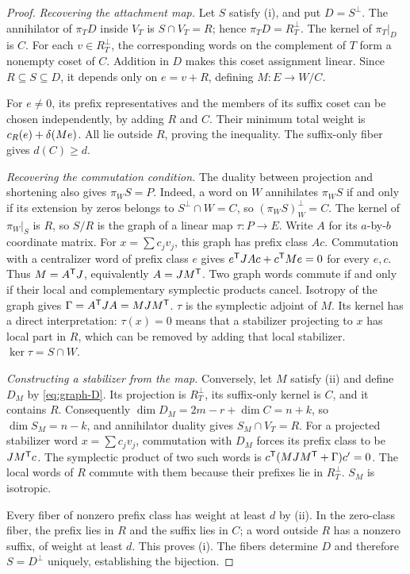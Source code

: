 \begin{proof}
\emph{Recovering the attachment map.}
Let \(S\) satisfy (i), and put \(D=S^\perp\). The annihilator of
\(\pi_TD\) inside \(V_T\) is \(S\cap V_T=R\); hence
\(\pi_TD=R_T^\perp\). The kernel of \(\pi_T|_D\) is \(C\).
For each \(v\in R_T^\perp\), the corresponding words on the
complement of \(T\) form a nonempty coset of \(C\). Addition in \(D\) makes this coset assignment linear. Since \(R\subseteq S\subseteq D\), it depends only
on \(e=v+R\), defining \(M:E\to W/C\).

For \(e\ne0\), its prefix representatives and the members of its suffix
coset can be chosen independently, by adding \(R\) and \(C\).
Their minimum total weight is
\(c_R(e)+\delta(Me)\). All lie outside \(R\), proving the inequality.
The suffix-only fiber gives \(d(C)\geq d\).

\emph{Recovering the commutation condition.}
The duality between projection and shortening also gives \(\pi_WS=P\). Indeed,
a word on \(W\) annihilates \(\pi_WS\) if and only if its extension
by zeros belongs to \(S^\perp\cap W=C\), so
\((\pi_WS)^\perp_W=C\). The kernel of
\(\pi_W|_S\) is \(R\), so \(S/R\) is the graph of a linear map
\(\tau:P\to E\). Write \(A\) for its \(a\)-by-\(b\) coordinate matrix.
For \(x=\sum c_jv_j\), this graph has prefix class \(Ac\).
Commutation with a centralizer word of prefix class \(e\) gives
\(e^\mathsf T JAc+c^\mathsf T Me=0\) for every \(e,c\). Thus
\(M=A^\mathsf T J\), equivalently \(A=JM^\mathsf T\). Two graph words
commute if and only if their local and complementary symplectic products
cancel. Isotropy of the graph gives
\(\Gamma=A^\mathsf T JA=MJM^\mathsf T\). \(\tau\) is the symplectic
adjoint of \(M\).
Its kernel has a direct interpretation: \(\tau(x)=0\) means that
a stabilizer projecting to \(x\) has local part in \(R\), which can
be removed by adding that local stabilizer. \(\ker\tau=S\cap W\).

\emph{Constructing a stabilizer from the map.}
Conversely, let \(M\) satisfy (ii) and define \(D_M\) by
\eqref{eq:graph-D}. Its projection is \(R_T^\perp\), its suffix-only
kernel is \(C\), and it contains \(R\). Consequently
\(\dim D_M=2m-r+\dim C=n+k\), so \(\dim S_M=n-k\),
and annihilator duality gives \(S_M\cap V_T=R\).
For a projected stabilizer word \(x=\sum c_jv_j\), commutation with
\(D_M\) forces its prefix class to be \(JM^\mathsf T c\). The symplectic product of
two such words is
\(c^\mathsf T(MJM^\mathsf T+\Gamma)c'=0\). The local words of \(R\) commute
with them because their prefixes lie in \(R_T^\perp\). \(S_M\)
is isotropic.

Every fiber of nonzero prefix class has weight at least \(d\) by (ii).
In the zero-class fiber, the prefix lies in \(R\) and the suffix lies in
\(C\); a word outside \(R\) has a nonzero suffix, of weight at least
\(d\). This proves (i). The fibers determine \(D\) and therefore
\(S=D^\perp\) uniquely, establishing the bijection.
\end{proof}

